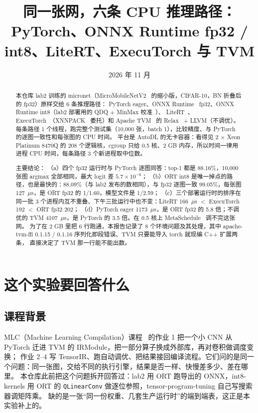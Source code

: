 \documentclass[11pt,a4paper]{ctexart}
\title{同一张网，六条 CPU 推理路径：\\PyTorch、ONNX Runtime fp32 / int8、LiteRT、ExecuTorch 与 TVM}
\author{\authorline}
\date{2026 年 11 月}
\begin{document}
\maketitle

\begin{abstract}
本仓库 lab2 训练的 micronet（MicroMobileNetV2~\cite{mobilenetv2} 的缩小版，CIFAR-10，BN 折叠后的 fp32）原样交给 6 条推理路径：
PyTorch eager、ONNX Runtime~\cite{ort} fp32、ONNX Runtime int8（lab2 部署用的 QDQ + MinMax 校准~\cite{jacob2018}）、
LiteRT~\cite{litert}、ExecuTorch~\cite{executorch}（XNNPACK~\cite{xnnpack} 委托）和 Apache TVM~\cite{tvm} 的 Relax~\cite{relax} + LLVM（不调优）。
每条路径 1 个线程，跑完整个测试集（10,000 张，batch 1），比较精度、与 PyTorch 的逐图一致性和每张图的 CPU 时间。
平台是 AutoDL 的无卡容器：看得见 2 × Xeon Platinum 8470Q 的 208 个逻辑核，cgroup 只给 0.5 核、2 GB 内存，所以时间一律用进程 CPU 时间，每条路径 3 个新进程取中位数。

主要结论：
（a）四个 fp32 运行时与 PyTorch 逐图同答：top-1 都是 88.16\%，10,000 张图 argmax 全部相同，最大 logit 差 $5.7\times10^{-6}$；
（b）ORT int8 是唯一掉点的路径，也是最快的：88.09\%（与 lab2 发布的数相同），与 fp32 逐图一致 99.05\%，每张图 127~$\mu$s，是 ORT fp32 的 1/1.60，模型文件是 1/2.59；
（c）三个部署运行时的排序在同一批 3 个进程内互不重叠、下午三批运行中也不变：LiteRT 166~$\mu$s $<$ ExecuTorch 192 $<$ ORT fp32 202；
（d）PyTorch eager 1173~$\mu$s，是 ORT fp32 的 5.8 倍；不调优的 TVM 4107~$\mu$s，是 PyTorch 的 3.5 倍。在 0.5 核上 MetaSchedule~\cite{metaschedule} 调不完这张网。
为了在 2 GB 里把 6 行跑通，本报告记录了 8 个环境问题及其处理，其中 apache-tvm-ffi 0.1.15 / 0.1.16 序列化即段错误、TVM 只要能导入 torch 就现编 C++ 扩展两条，
直接决定了 TVM 那一行能不能出数。
\end{abstract}

\tableofcontents
\newpage

\section{这个实验要回答什么}

\subsection{课程背景}
MLC（Machine Learning Compilation）课程~\cite{mlc} 的作业 1 把一个小 CNN 从 PyTorch 迁进 TVM 的 IRModule，把一部分算子换成外部库，再对卷积做调度变换；
作业 2--4 写 TensorIR、跑自动调优、把结果接回编译流程。它们问的是同一个问题：同一张图，交给不同的执行引擎，结果是否一样、快慢差多少、差在哪里。
本仓库此前把这个问题拆开回答过：lab2 用 ORT 跑导出的 ONNX，int8-kernels 用 ORT 的 \texttt{QLinearConv} 做逐位参照，tensor-program-tuning 自己写搜索器调矩阵乘。
缺的是一张“同一份权重、几套生产运行时”的端到端表，这正是本实验补上的。
\end{document}
